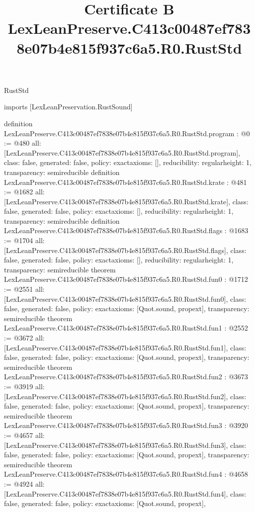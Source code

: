 \begin{lexlean}{RustStd}
\title{Certificate B LexLeanPreserve.C413c00487ef7838e07b4e815f937c6a5.R0.RustStd}
\begin{coremodule}
imports [LexLeanPreservation.RustSound]

definition LexLeanPreserve.C413c00487ef7838e07b4e815f937c6a5.R0.RustStd.program : @0 := @480 {
  all: [LexLeanPreserve.C413c00487ef7838e07b4e815f937c6a5.R0.RustStd.program],
  class: false,
  generated: false,
  policy: exact{axioms: []},
  reducibility: regular{height: 1},
  transparency: semireducible
}
definition LexLeanPreserve.C413c00487ef7838e07b4e815f937c6a5.R0.RustStd.krate : @481 := @1682 {
  all: [LexLeanPreserve.C413c00487ef7838e07b4e815f937c6a5.R0.RustStd.krate],
  class: false,
  generated: false,
  policy: exact{axioms: []},
  reducibility: regular{height: 1},
  transparency: semireducible
}
definition LexLeanPreserve.C413c00487ef7838e07b4e815f937c6a5.R0.RustStd.flags : @1683 := @1704 {
  all: [LexLeanPreserve.C413c00487ef7838e07b4e815f937c6a5.R0.RustStd.flags],
  class: false,
  generated: false,
  policy: exact{axioms: []},
  reducibility: regular{height: 1},
  transparency: semireducible
}
theorem LexLeanPreserve.C413c00487ef7838e07b4e815f937c6a5.R0.RustStd.fun0 : @1712 := @2551 {
  all: [LexLeanPreserve.C413c00487ef7838e07b4e815f937c6a5.R0.RustStd.fun0],
  class: false,
  generated: false,
  policy: exact{axioms: [Quot.sound, propext]},
  transparency: semireducible
}
theorem LexLeanPreserve.C413c00487ef7838e07b4e815f937c6a5.R0.RustStd.fun1 : @2552 := @3672 {
  all: [LexLeanPreserve.C413c00487ef7838e07b4e815f937c6a5.R0.RustStd.fun1],
  class: false,
  generated: false,
  policy: exact{axioms: [Quot.sound, propext]},
  transparency: semireducible
}
theorem LexLeanPreserve.C413c00487ef7838e07b4e815f937c6a5.R0.RustStd.fun2 : @3673 := @3919 {
  all: [LexLeanPreserve.C413c00487ef7838e07b4e815f937c6a5.R0.RustStd.fun2],
  class: false,
  generated: false,
  policy: exact{axioms: [Quot.sound, propext]},
  transparency: semireducible
}
theorem LexLeanPreserve.C413c00487ef7838e07b4e815f937c6a5.R0.RustStd.fun3 : @3920 := @4657 {
  all: [LexLeanPreserve.C413c00487ef7838e07b4e815f937c6a5.R0.RustStd.fun3],
  class: false,
  generated: false,
  policy: exact{axioms: [Quot.sound, propext]},
  transparency: semireducible
}
theorem LexLeanPreserve.C413c00487ef7838e07b4e815f937c6a5.R0.RustStd.fun4 : @4658 := @4924 {
  all: [LexLeanPreserve.C413c00487ef7838e07b4e815f937c6a5.R0.RustStd.fun4],
  class: false,
  generated: false,
  policy: exact{axioms: [Quot.sound, propext]},
}
\end{coremodule}
\end{lexlean}

